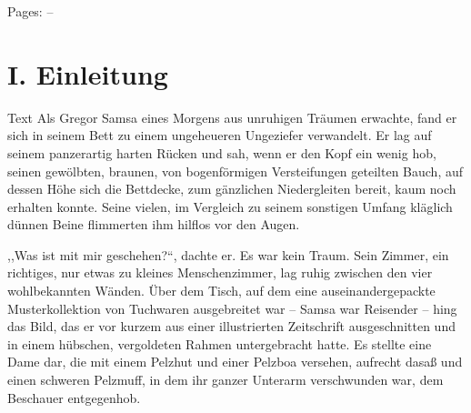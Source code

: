 \documentclass[prepress]{zchinr}
\begin{document}

\printtitle

\printissuetoc

Pages: \currentissuefirstpage--\currentissuelastpage



\printtitle

\section{I. Einleitung}

Text Als Gregor Samsa eines Morgens aus unruhigen Träumen erwachte, fand er sich in seinem Bett zu einem ungeheueren Ungeziefer verwandelt. Er lag auf seinem panzerartig harten Rücken und sah, wenn er den Kopf ein wenig hob, seinen gewölbten, braunen, von bogenförmigen Versteifungen geteilten Bauch, auf dessen Höhe sich die Bettdecke, zum gänzlichen Niedergleiten bereit, kaum noch erhalten konnte. Seine vielen, im Vergleich zu seinem sonstigen Umfang kläglich dünnen Beine flimmerten ihm hilflos vor den Augen.

,,Was ist mit mir geschehen?{}``, dachte er. Es war kein Traum. Sein Zimmer, ein richtiges, nur etwas zu kleines Menschenzimmer, lag ruhig zwischen den vier wohlbekannten Wänden. Über dem Tisch, auf dem eine auseinandergepackte Musterkollektion von Tuchwaren ausgebreitet war -- Samsa war Reisender -- hing das Bild, das er vor kurzem aus einer illustrierten Zeitschrift ausgeschnitten und in einem hübschen, vergoldeten Rahmen untergebracht hatte. Es stellte eine Dame dar, die mit einem Pelzhut und einer Pelzboa versehen, aufrecht dasaß und einen schweren Pelzmuff, in dem ihr ganzer Unterarm verschwunden war, dem Beschauer entgegenhob.
\end{document}
